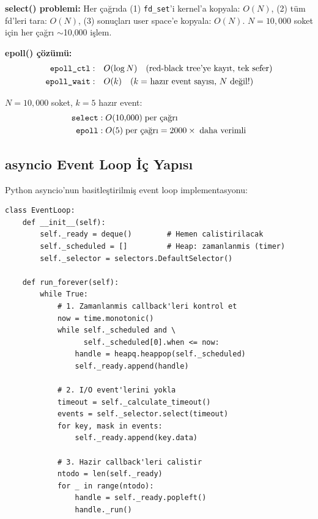\textbf{select() problemi:} Her \c{c}a\u{g}r{\i}da (1) \texttt{fd\_set}'i kernel'a kopyala: $O(N)$, (2) t\"{u}m fd'leri tara: $O(N)$, (3) sonu\c{c}lar{\i} user space'e kopyala: $O(N)$. $N = 10{,}000$ soket i\c{c}in her \c{c}a\u{g}r{\i} $\sim$10{,}000 i\c{s}lem.

\textbf{epoll() \c{c}\"{o}z\"{u}m\"{u}:}
\begin{align}
\texttt{epoll\_ctl}: &\quad O(\log N) \quad \text{(red-black tree'ye kay{\i}t, tek sefer)} \\
\texttt{epoll\_wait}: &\quad O(k) \quad \text{($k =$ haz{\i}r event say{\i}s{\i}, $N$ de\u{g}il!)}
\end{align}

\begin{ornek}
$N = 10{,}000$ soket, $k = 5$ haz{\i}r event:
\begin{align*}
\texttt{select} &: O(10{,}000) \;\text{per \c{c}a\u{g}r{\i}} \\
\texttt{epoll}  &: O(5) \;\text{per \c{c}a\u{g}r{\i}} = 2000\times \;\text{daha verimli}
\end{align*}
\end{ornek}

\subsection{asyncio Event Loop \.{I}\c{c} Yap{\i}s{\i}}
\label{sec:asyncio-internals}

Python asyncio'nun basitle\c{s}tirilmi\c{s} event loop implementasyonu:

\begin{lstlisting}[caption={asyncio event loop i\c{c} yap{\i}s{\i} (basitle\c{s}tirilmi\c{s})},label={lst:event-loop}]
class EventLoop:
    def __init__(self):
        self._ready = deque()        # Hemen calistirilacak
        self._scheduled = []         # Heap: zamanlanmis (timer)
        self._selector = selectors.DefaultSelector()

    def run_forever(self):
        while True:
            # 1. Zamanlanmis callback'leri kontrol et
            now = time.monotonic()
            while self._scheduled and \
                  self._scheduled[0].when <= now:
                handle = heapq.heappop(self._scheduled)
                self._ready.append(handle)

            # 2. I/O event'lerini yokla
            timeout = self._calculate_timeout()
            events = self._selector.select(timeout)
            for key, mask in events:
                self._ready.append(key.data)

            # 3. Hazir callback'leri calistir
            ntodo = len(self._ready)
            for _ in range(ntodo):
                handle = self._ready.popleft()
                handle._run()
\end{lstlisting}

